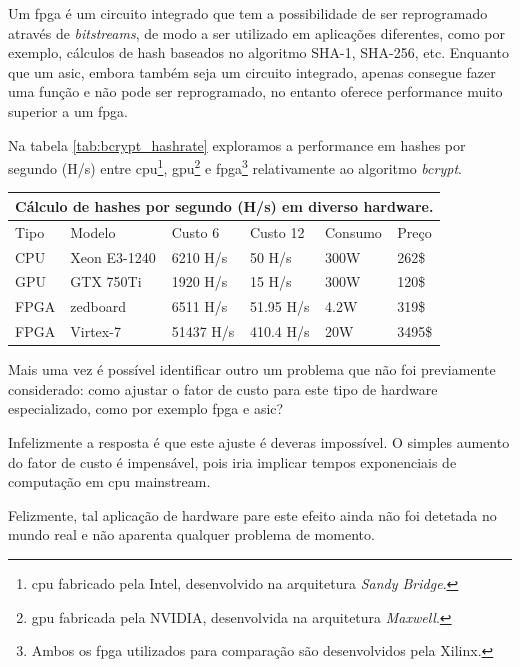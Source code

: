 Um \gls{fpga} é um circuito integrado que tem a possibilidade de ser reprogramado através de \emph{bitstreams}, de modo a ser utilizado em aplicações diferentes, como por exemplo, cálculos de hash baseados no algoritmo SHA-1, SHA-256, etc. Enquanto que um \gls{asic}, embora também seja um circuito integrado, apenas consegue fazer uma função e não pode ser reprogramado, no entanto oferece performance muito superior a um \gls{fpga}.

Na tabela \ref{tab:bcrypt_hashrate} exploramos a performance em hashes por segundo (H/s) entre \gls{cpu}\footnote{\gls{cpu} fabricado pela Intel, desenvolvido na arquitetura \emph{Sandy Bridge}.}, \gls{gpu}\footnote{\gls{gpu} fabricada pela NVIDIA, desenvolvida na arquitetura \emph{Maxwell}.} e \gls{fpga}\footnote{Ambos os \gls{fpga} utilizados para comparação são desenvolvidos pela Xilinx.} relativamente ao algoritmo \emph{bcrypt}.

\begin{center}
    \begin{tabular}{ |p{1cm}|p{2.5cm}|p{2cm}|p{2cm}|p{1.75cm}|p{0.9cm}|  }
        \hline
        \multicolumn{6}{|c|}{Cálculo de hashes por segundo (H/s) em diverso hardware.} \\
        \hline
        Tipo & Modelo & Custo 6 & Custo 12 & Consumo & Preço\\
        \hline
        CPU & Xeon E3-1240 & 6210 H/s & 50 H/s& 300W & 262\$\\
        GPU & GTX 750Ti & 1920 H/s& 15 H/s& 300W & 120\$\\
        FPGA & zedboard & 6511 H/s & 51.95 H/s& 4.2W & 319\$\\
        FPGA & Virtex-7 & 51437 H/s& 410.4 H/s& 20W & 3495\$\\
        \hline
    \end{tabular}
\label{tab:bcrypt_hashrate} 
\end{center}

Mais uma vez é possível identificar outro um problema que não foi previamente considerado: como ajustar o fator de custo para este tipo de hardware especializado, como por exemplo \gls{fpga} e \gls{asic}?

Infelizmente a resposta é que este ajuste é deveras impossível. O simples aumento do fator de custo é impensável, pois iria implicar tempos exponenciais de computação em \gls{cpu} mainstream.

Felizmente, tal aplicação de hardware pare este efeito ainda não foi detetada no mundo real e não aparenta qualquer problema de momento.

